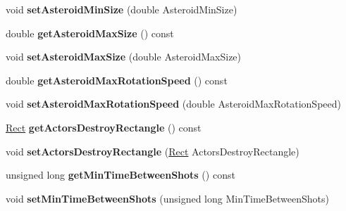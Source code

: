 \begin{DoxyCompactItemize}
\item 
void {\bfseries set\+Asteroid\+Min\+Size} (double Asteroid\+Min\+Size)\hypertarget{classGameConfiguration_ae9571295579a14d194aa323fd18d1af5}{}\label{classGameConfiguration_ae9571295579a14d194aa323fd18d1af5}

\item 
double {\bfseries get\+Asteroid\+Max\+Size} () const \hypertarget{classGameConfiguration_a6682cb792406d5a608305c456a0cbc70}{}\label{classGameConfiguration_a6682cb792406d5a608305c456a0cbc70}

\item 
void {\bfseries set\+Asteroid\+Max\+Size} (double Asteroid\+Max\+Size)\hypertarget{classGameConfiguration_a5cfae7eea03c34f7cc097e3c667b6335}{}\label{classGameConfiguration_a5cfae7eea03c34f7cc097e3c667b6335}

\item 
double {\bfseries get\+Asteroid\+Max\+Rotation\+Speed} () const \hypertarget{classGameConfiguration_a35c00d7f7818d59d76b9a63589c9bfa3}{}\label{classGameConfiguration_a35c00d7f7818d59d76b9a63589c9bfa3}

\item 
void {\bfseries set\+Asteroid\+Max\+Rotation\+Speed} (double Asteroid\+Max\+Rotation\+Speed)\hypertarget{classGameConfiguration_a87f4ca20e42bd2d07f292a8e2596a1d2}{}\label{classGameConfiguration_a87f4ca20e42bd2d07f292a8e2596a1d2}

\item 
\hyperlink{classRect}{Rect} {\bfseries get\+Actors\+Destroy\+Rectangle} () const \hypertarget{classGameConfiguration_a6c4f151aedb397cd7b7fa8ede6aa9c01}{}\label{classGameConfiguration_a6c4f151aedb397cd7b7fa8ede6aa9c01}

\item 
void {\bfseries set\+Actors\+Destroy\+Rectangle} (\hyperlink{classRect}{Rect} Actors\+Destroy\+Rectangle)\hypertarget{classGameConfiguration_ad2b1d277b902ff84873f5f29092bc969}{}\label{classGameConfiguration_ad2b1d277b902ff84873f5f29092bc969}

\item 
unsigned long {\bfseries get\+Min\+Time\+Between\+Shots} () const \hypertarget{classGameConfiguration_a5ab85a55d0dc5bc1ebe84a2cbe6ec4ab}{}\label{classGameConfiguration_a5ab85a55d0dc5bc1ebe84a2cbe6ec4ab}

\item 
void {\bfseries set\+Min\+Time\+Between\+Shots} (unsigned long Min\+Time\+Between\+Shots)\hypertarget{classGameConfiguration_adb04c39017aa07d76e61d7bcf9d29572}{}\label{classGameConfiguration_adb04c39017aa07d76e61d7bcf9d29572}


\end{DoxyCompactItemize}
